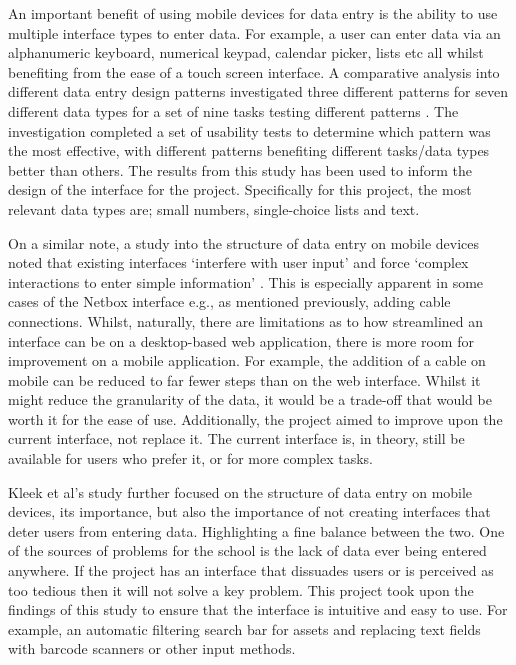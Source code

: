 \documentclass [11pt,a4paper]{article}
\begin{document}
An important benefit of using mobile devices for data entry is the ability to use multiple interface types to enter data. For example, a user can enter data via an alphanumeric keyboard, numerical keypad, calendar picker, lists etc all whilst benefiting from the ease of a touch screen interface. A comparative analysis into different data entry design patterns investigated three different patterns for seven different data types for a set of nine tasks testing different patterns \cite{myka2019comparative}. The investigation completed a set of usability tests to determine which pattern was the most effective, with different patterns benefiting different tasks/data types better than others. The results from this study has been used to inform the design of the interface for the project. Specifically for this project, the most relevant data types are; small numbers, single-choice lists and text.

On a similar note, a study into the structure of data entry on mobile devices noted that existing interfaces `interfere with user input' and force `complex interactions to enter simple information' \cite{van2007gui}. This is especially apparent in some cases of the Netbox interface e.g., as mentioned previously, adding cable connections. Whilst, naturally, there are limitations as to how streamlined an interface can be on a desktop-based web application, there is more room for improvement on a mobile application. For example, the addition of a cable on mobile can be reduced to far fewer steps than on the web interface. Whilst it might reduce the granularity of the data, it would be a trade-off that would be worth it for the ease of use. Additionally, the project aimed to improve upon the current interface, not replace it. The current interface is, in theory, still be available for users who prefer it, or for more complex tasks.

Kleek et al's \cite{van2007gui} study further focused on the structure of data entry on mobile devices, its importance, but also the importance of not creating interfaces that deter users from entering data. Highlighting a fine balance between the two. One of the sources of problems for the school is the lack of data ever being entered anywhere. If the project has an interface that dissuades users or is perceived as too tedious then it will not solve a key problem. This project took upon the findings of this study to ensure that the interface is intuitive and easy to use. For example, an automatic filtering search bar for assets and replacing text fields with barcode scanners or other input methods.
\end{document}
